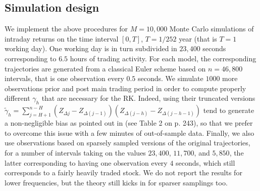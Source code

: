 \documentclass[11pt]{article}
\numberwithin{equation}{section}
\theoremstyle{plain}
\theoremstyle{remark}
\begin{document}
\subsection{Simulation design}\label{simDesign}

We implement the above procedures for $M=10,000$ Monte Carlo simulations of intraday returns on the time interval $[0,T]$, $T=1/252$ year (that is $T=1$ working day). One working day is in turn subdivided in $23,400$ seconds corresponding to $6.5$ hours of trading activity. For each model, the corresponding trajectories are generated from a classical Euler scheme based on $n=46,800$ intervals, that is one observation every $0.5$ seconds. We simulate $1000$ more observations prior and post main trading period in order to compute properly different $\gamma_h$ that are necessary for the RK. Indeed, using their truncated versions $\tilde{\gamma}_h = \sum_{j=H+1}^{n-H} (Z_{\Delta j} - Z_{\Delta (j-1)}) (Z_{\Delta (j - h)} - Z_{\Delta (j-h-1)})$ tend to generate a non-negligible bias as pointed out in \cite{xiu2010quasi} (see Table 2 on p. 243), so that we prefer to overcome this issue with a few minutes of out-of-sample data. Finally, we also use observations based on sparsely sampled versions of the original trajectories, for a number of intervals taking on the values $23,400$, $11,700$, and $5,850$, the latter corresponding to having one observation every $4$ seconds, which still corresponds to a fairly heavily traded stock. We do not report the results for lower frequencies, but the theory still kicks in for sparser samplings too.
\end{document}
